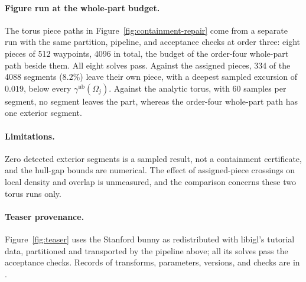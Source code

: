 \paragraph{Figure run at the whole-part budget.}
\label{sec:experiments-torus-figure}
The torus piece paths in Figure~\ref{fig:containment-repair} come from a separate run with the same partition, pipeline, and acceptance checks at order three: eight pieces of 512 waypoints, 4096 in total, the budget of the order-four whole-part path beside them. All eight solves pass. Against the assigned pieces, 334 of the 4088 segments ($8.2\%$) leave their own piece, with a deepest sampled excursion of $0.019$, below every $\gamma^{\mathrm{ub}}(\Omega_j)$. Against the analytic torus, with 60 samples per segment, no segment leaves the part, whereas the order-four whole-part path has one exterior segment.

\paragraph{Limitations.}
Zero detected exterior segments is a sampled result, not a containment certificate, and the hull-gap bounds are numerical. The effect of assigned-piece crossings on local density and overlap is unmeasured, and the comparison concerns these two torus runs only.


\paragraph{Teaser provenance.}
Figure~\ref{fig:teaser} uses the Stanford bunny as redistributed with libigl's tutorial data, partitioned and transported by the pipeline above; all its solves pass the acceptance checks. Records of transforms, parameters, versions, and checks are in .
